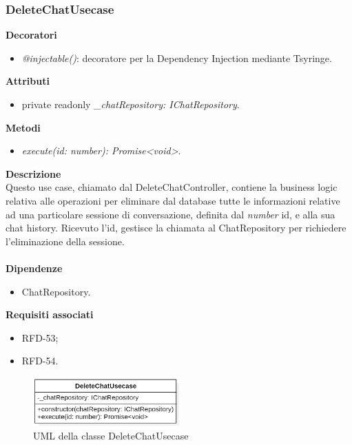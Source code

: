 \subsubsection{DeleteChatUsecase}
\textbf{Decoratori}
\begin{itemize}
    \item \textit{@injectable()}: decoratore per la Dependency Injection mediante Tsyringe.
\end{itemize}
\textbf{Attributi}
\begin{itemize}
    \item private readonly \textit{\_chatRepository: IChatRepository}.
\end{itemize}
\textbf{Metodi}
\begin{itemize}
    \item \textit{execute(id: number): Promise<void>}.
\end{itemize}
\textbf{Descrizione}\\
Questo use case, chiamato dal DeleteChatController, contiene la business logic relativa alle operazioni per eliminare dal database tutte le informazioni relative ad una particolare sessione di conversazione, definita dal \textit{number} id, e alla sua chat history. Ricevuto l'id, gestisce la chiamata al ChatRepository per richiedere l'eliminazione della sessione.\\ \\
\textbf{Dipendenze}
\begin{itemize}
    \item ChatRepository.
\end{itemize}
\textbf{Requisiti associati}
\begin{itemize}[itemsep=-4pt]
    \item RFD-53;
    \item RFD-54.
\end{itemize}

\begin{figure}[h!]
    \centering  
    \includegraphics[width=0.5\textwidth]{DeleteChatUsecase.png}
    \caption{UML della classe DeleteChatUsecase}
\end{figure}

